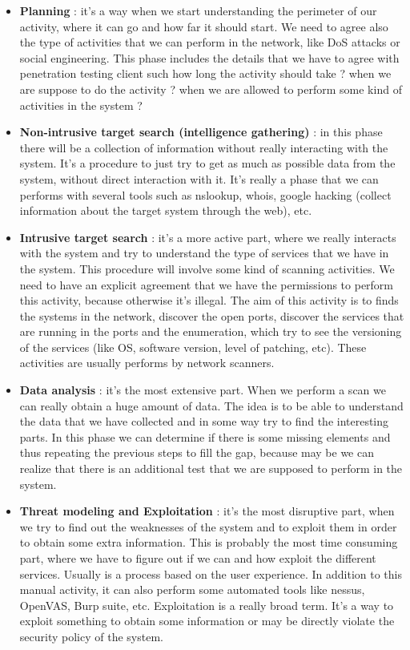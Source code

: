 \documentclass[11pt]{article}
\begin{document}
\begin{itemize}
\item \textbf{Planning} : it's a way when we start understanding the perimeter of our activity, where it can go and how far it should start. We need to agree also the type of activities that we can perform in the network, like DoS attacks or social engineering. This phase includes the details that we have to agree with penetration testing client such how long the activity should take ? when we are suppose to do the activity ? when we are allowed to perform some kind of activities in the system ? 
\item \textbf{Non-intrusive target search (intelligence gathering)} : in this phase there will be a collection of information without really interacting with the system. It's a procedure to just try to get as much as possible data from the system, without direct interaction with it. It's really a phase that we can performs with several tools such as nslookup, whois, google hacking (collect information about the target system through the web), etc.
\item \textbf{Intrusive target search} : it's a more active part, where we really interacts with the system and try to understand the type of services that we have in the system. This procedure will involve some kind of scanning activities. We need to have an explicit agreement that we have the permissions to perform this activity, because otherwise it's illegal. The aim of this activity is to finds the systems in the network, discover the open ports, discover the services that are running in the ports and the enumeration, which try to see the versioning of the services (like OS, software version, level of patching, etc). These activities are usually performs by network scanners.
\item \textbf{Data analysis} : it's the most extensive part. When we perform a scan we can really obtain a huge amount of data. The idea is to be able to understand the data that we have collected and in some way try to find the interesting parts. In this phase we can determine if there is some missing elements and thus repeating the previous steps to fill the gap, because may be we can realize that there is an additional test that we are supposed to perform in the system.
\item \textbf{Threat modeling and Exploitation} : it's the most disruptive part, when we try to find out the weaknesses of the system and to exploit them in order to obtain some extra information. This is probably the most time consuming part, where we have to figure out if we can and how exploit the different services. Usually is a process based on the user experience. In addition to this manual activity, it can also perform some automated tools like nessus, OpenVAS, Burp suite, etc. Exploitation is a really broad term. It's a way to exploit something to obtain some information or may be directly violate the security policy of the system.

\end{itemize}
\end{document}
